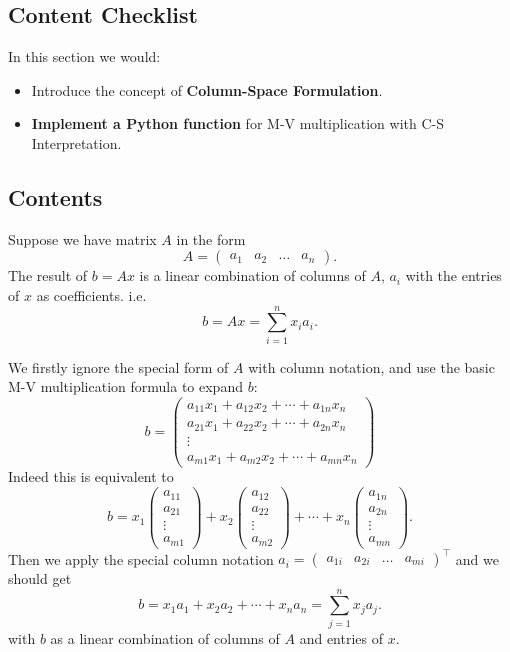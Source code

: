 \subsection*{Content Checklist}
\noindent In this section we would:
\begin{itemize}
  \item Introduce the concept of \textbf{Column-Space Formulation}. 
  \item \textbf{Implement a Python function} for M-V multiplication with C-S Interpretation.
\end{itemize}
\subsection*{Contents}
\begin{definition}
  Suppose we have matrix \(A\)  in the form
  \[
    A = \begin{pmatrix}
      a_1 & a_2 & \ldots & a_n
    \end{pmatrix}
  .\]
  The result of \(b = Ax\)  is a linear combination of columns of \(A\), \(a_i\)  with the entries of \(x\)  as coefficients. i.e.
  \[
    b = Ax =  \sum_{i=1}^{n} x_i a_i
  .\]
\end{definition}
\begin{explanation}
  We firstly ignore the special form of \(A\) with column notation, and use the basic M-V multiplication formula to expand \(b\):
  \[
b = \begin{pmatrix} a_{11}x_1 + a_{12}x_2 + \cdots + a_{1n}x_n \\  a_{21}x_1 + a_{22}x_2 + \cdots + a_{2n}x_n\\ \vdots\\a_{m1}x_1 + a_{m2}x_2 + \cdots + a_{mn}x_n \end{pmatrix}
\]
Indeed this is equivalent to
\[
b = x_1\begin{pmatrix} a_{11}\\ a_{21} \\ \vdots\\ a_{m1} \end{pmatrix} + x_2 
\begin{pmatrix} a_{12}\\ a_{22} \\ \vdots\\ a_{m2} \end{pmatrix} + \cdots + x_n 
\begin{pmatrix} a_{1n}\\ a_{2n} \\ \vdots\\ a_{mn} \end{pmatrix}
.\]
Then we apply the special column notation \(a_i = \begin{pmatrix} a_{1i} & a_{2i} & \ldots & a_{mi} \end{pmatrix}^{\top}\) and we should get
\[
  b = x_1a_1 + x_2a_2 + \cdots + x_na_n = \sum_{j=1}^{n} x_j a_j
.\]
with \(b\) as a linear combination of columns of \(A\) and entries of $x$. 
\end{explanation}

